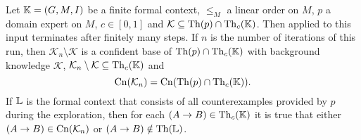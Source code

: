 \begin{Corollary}
  \label{cor:exploration-by-confidence-weaker-version-properties}
  Let ${\mathbb{K}} = (G, M, I)$ be a finite formal context, $\leq_{M}$ a linear order on $M$,
  $p$ a domain expert on $M$, $c \in [0,1]$ and $\mathcal{K} \subseteq \operatorname{Th}(p) \cap
  \operatorname{Th}_{c}({\mathbb{K}})$.  Then 
  applied to this input terminates after finitely many steps.  If $n$ is the number of
  iterations of this run, then $\mathcal{K}_{n} \setminus \mathcal{K}$ is a confident base
  of $\operatorname{Th}(p) \cap \operatorname{Th}_{c}({\mathbb{K}})$ with background knowledge $\mathcal{K}$, \ie
  $\mathcal{K}_{n} \setminus \mathcal{K} \subseteq \operatorname{Th}_{c}({\mathbb{K}})$ and
  \begin{equation*}
    \operatorname{Cn}(\mathcal{K}_{n}) = \operatorname{Cn}(\operatorname{Th}(p) \cap \operatorname{Th}_{c}({\mathbb{K}})).
  \end{equation*}
  If ${\mathbb{L}}$ is the formal context that consists of all counterexamples provided by $p$
  during the exploration, then for each $(A \to B) \in \operatorname{Th}_{c}({\mathbb{K}})$ it is true that
  either $(A \to B) \in \operatorname{Cn}(\mathcal{K}_{n})$ or $(A \to B) \notin \operatorname{Th}({\mathbb{L}})$.
\end{Corollary}


